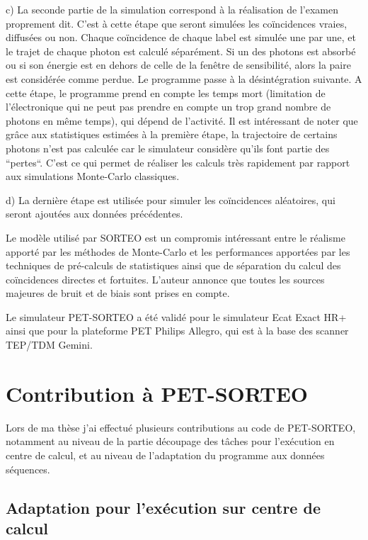 c) La seconde partie de la simulation correspond à la réalisation de l'examen proprement dit. C'est à cette étape que seront simulées les coïncidences vraies, diffusées ou non. Chaque coïncidence de chaque label est simulée une par une, et le trajet de chaque photon est calculé séparément. Si un des photons est absorbé ou si son énergie est en dehors de celle de la fenêtre de sensibilité, alors la paire est considérée comme perdue. Le programme passe à la désintégration suivante. A cette étape, le programme prend en compte les temps mort (limitation de l'électronique qui ne peut pas prendre en compte un trop grand nombre de photons en même temps), qui dépend de l'activité. Il est intéressant de noter que grâce aux statistiques estimées à la première étape, la trajectoire de certains photons n'est pas calculée car le simulateur considère qu'ils font partie des ``pertes``. C'est ce qui permet de réaliser les calculs très rapidement par rapport aux simulations Monte-Carlo classiques.

d) La dernière étape est utilisée pour simuler les coïncidences aléatoires, qui seront ajoutées aux données précédentes. 


Le modèle utilisé par SORTEO est un compromis intéressant entre le réalisme apporté par les méthodes de Monte-Carlo et les performances apportées par les techniques de pré-calculs de statistiques ainsi que de séparation du calcul des coïncidences directes et fortuites. L'auteur annonce que toutes les sources majeures de bruit et de biais sont prises en compte.

Le simulateur PET-SORTEO a été validé pour le simulateur Ecat Exact HR+~\cite{reilhac2004pet} ainsi que pour la plateforme PET Philips Allegro, qui est à la base des scanner TEP/TDM Gemini. 


	\section{Contribution à PET-SORTEO}

Lors de ma thèse j'ai effectué plusieurs contributions au code de PET-SORTEO, notamment au niveau de la partie découpage des tâches pour l'exécution en centre de calcul, et au niveau de l'adaptation du programme aux données séquences.

\subsection{Adaptation pour l'exécution sur centre de calcul}

